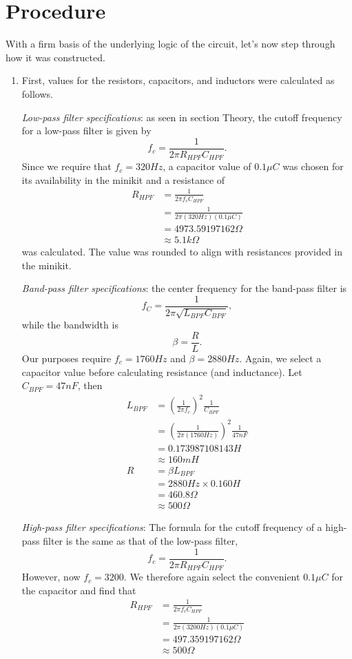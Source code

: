 \documentclass[notitlepage, 12pt]{report}
\begin{document}
\pagebreak

\section*{Procedure}
With a firm basis of the underlying logic of the circuit, let's now 
step through how it was constructed. 
\begin{enumerate}
    \item First, values for the resistors, capacitors, and inductors were calculated as follows. 
    
    \emph{Low-pass filter specifications}: as seen in section Theory, the cutoff 
    frequency for a low-pass filter is given by 
    \[f_c = \frac{1}{2 \pi R_{HPF} C_{HPF}}.\]
    Since we require that $f_c = 320 Hz$, a capacitor value of $0.1 \mu C$ was chosen 
    for its availability in the minikit and a resistance of 
    \begin{align}
        R_{HPF} &= \frac{1}{2 \pi f_c C_{HPF}} \\
        &= \frac{1}{2 \pi (320 Hz) (0.1 \mu C)} \\
        &= 4973.59197162 \Omega \\
        &\approx 5.1 k\Omega
    \end{align}
    was calculated. The value was rounded to align with resistances provided in the minikit. 

    \emph{Band-pass filter specifications}: the center frequency for the band-pass filter is 
        \[f_C = \frac{1}{2 \pi \sqrt{L_{BPF} C_{BPF}}},\]
    while the bandwidth is 
        \[\beta = \frac{R}{L}.\]
    Our purposes require $f_c = 1760 Hz$ and $\beta = 2880 Hz$. Again, we select a 
    capacitor value before calculating resistance (and inductance). Let $C_{BPF} = 47 nF$, 
    then 
    \begin{align}
        L_{BPF} &= (\frac{1}{2\pi f_c})^2 \frac{1}{C_{BPF}} \\
        &= (\frac{1}{2\pi (1760 Hz)})^2 \frac{1}{47 nF} \\
        &= 0.173987108143 H \\
        &\approx 160 mH \\
        R &= \beta L_{BPF} \\
        &= 2880 Hz \times 0.160 H \\
        &= 460.8 \Omega \\
        &\approx 500 \Omega
    \end{align}
    
    \emph{High-pass filter specifications}: The formula for the cutoff frequency of a high-pass 
    filter is the same as that of the low-pass filter, 
        \[f_c = \frac{1}{2 \pi R_{HPF} C_{HPF}}.\]
    However, now $f_c = 3200$. We therefore again select the convenient $0.1 \mu C$ for the capacitor
    and find that 
    \begin{align}
        R_{HPF} &= \frac{1}{2 \pi f_c C_{HPF}} \\
        &= \frac{1}{2 \pi (3200 Hz) (0.1 \mu C)} \\
        &= 497.359197162 \Omega \\
        &\approx 500 \Omega
    \end{align}


\end{enumerate}
\end{document}
